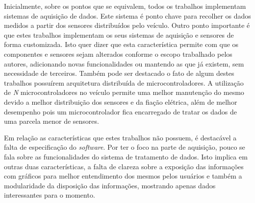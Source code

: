 Inicialmente, sobre os pontos que se equivalem, todos os trabalhos implementam sistemas de aquisição de dados. Este sistema é ponto chave para recolher os dados medidos a partir dos sensores distribuídos pelo veículo. Outro ponto importante é que estes trabalhos implementam os seus sistemas de aquisição e sensores de forma customizada. Isto quer dizer que esta característica permite com que os componentes e sensores sejam alterados conforme o escopo trabalhado pelos autores, adicionando novas funcionalidades ou mantendo as que já existem, sem necessidade de terceiros. Também pode ser destacado o fato de algum destes trabalhos possuírem arquitetura distribuída de microcontroladores. A utilização de \textit{N} microcontroladores no veículo permite uma melhor manutenção do mesmo devido a melhor distribuição dos sensores e da fiação elétrica, além de melhor desempenho pois um microcontrolador fica encarregado de tratar os dados de uma parcela menor de sensores.

Em relação as características que estes trabalhos não possuem, é destacável a falta de especificação do \textit{software}. Por ter o foco na parte de aquisição, pouco se fala sobre as funcionalidades do sistema de tratamento de dados. Isto implica em outras duas características, a falta de clareza sobre a exposição das informações com gráficos para melhor entendimento dos mesmos pelos usuários e também a modularidade da disposição das informações, mostrando apenas dados interessantes para o momento.  
